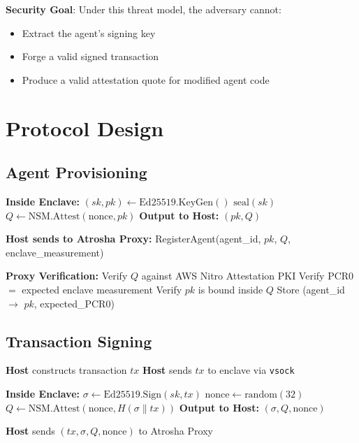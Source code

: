 \documentclass[conference]{IEEEtran}
\begin{document}
\textbf{Security Goal}: Under this threat model, the adversary cannot:
\begin{itemize}
    \item Extract the agent's signing key
    \item Forge a valid signed transaction
    \item Produce a valid attestation quote for modified agent code
\end{itemize}

\section{Protocol Design}

\subsection{Agent Provisioning}

\begin{algorithm}
\caption{TAAI Agent Provisioning}
\begin{algorithmic}[1]
\STATE \textbf{Inside Enclave:}
\STATE $(sk, pk) \leftarrow \text{Ed25519.KeyGen}()$
\STATE $\text{seal}(sk)$ 
\STATE $Q \leftarrow \text{NSM.Attest}(\text{nonce}, pk)$ 
\STATE \textbf{Output to Host:} $(pk, Q)$

\STATE \textbf{Host sends to Atrosha Proxy:}
\STATE RegisterAgent(agent\_id, $pk$, $Q$, enclave\_measurement)

\STATE \textbf{Proxy Verification:}
\STATE Verify $Q$ against AWS Nitro Attestation PKI
\STATE Verify PCR0 $=$ expected enclave measurement
\STATE Verify $pk$ is bound inside $Q$
\STATE Store (agent\_id $\rightarrow$ $pk$, expected\_PCR0)
\end{algorithmic}
\end{algorithm}

\subsection{Transaction Signing}

\begin{algorithm}
\caption{TAAI Transaction Signing}
\begin{algorithmic}[1]
\STATE \textbf{Host} constructs transaction $tx$
\STATE \textbf{Host} sends $tx$ to enclave via \texttt{vsock}

\STATE \textbf{Inside Enclave:}
\STATE $\sigma \leftarrow \text{Ed25519.Sign}(sk, tx)$
\STATE $\text{nonce} \leftarrow \text{random}(32)$
\STATE $Q \leftarrow \text{NSM.Attest}(\text{nonce}, H(\sigma \| tx))$
\STATE \textbf{Output to Host:} $(\sigma, Q, \text{nonce})$

\STATE \textbf{Host} sends $(tx, \sigma, Q, \text{nonce})$ to Atrosha Proxy
\end{algorithmic}
\end{algorithm}
\end{document}
